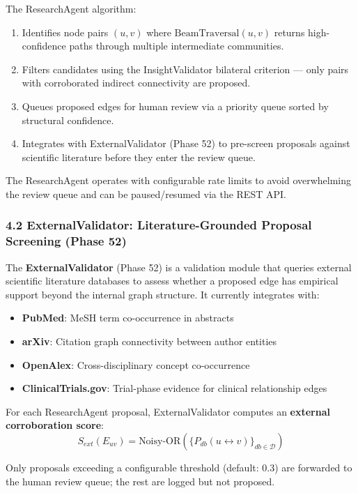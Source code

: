 The ResearchAgent algorithm:
\begin{enumerate}
  \item Identifies node pairs $(u, v)$ where $\text{BeamTraversal}(u, v)$ returns high-confidence paths through multiple intermediate communities.
  \item Filters candidates using the InsightValidator bilateral criterion --- only pairs with corroborated indirect connectivity are proposed.
  \item Queues proposed edges for human review via a priority queue sorted by structural confidence.
  \item Integrates with ExternalValidator (Phase 52) to pre-screen proposals against scientific literature before they enter the review queue.
\end{enumerate}


The ResearchAgent operates with configurable rate limits to avoid overwhelming the review queue and can be paused/resumed via the REST API.

\subsubsection*{4.2 ExternalValidator: Literature-Grounded Proposal Screening (Phase 52)}
The \textbf{ExternalValidator} (Phase 52) is a validation module that queries external scientific literature databases to assess whether a proposed edge has empirical support beyond the internal graph structure. It currently integrates with:

\begin{itemize}
  \item \textbf{PubMed}: MeSH term co-occurrence in abstracts
  \item \textbf{arXiv}: Citation graph connectivity between author entities
  \item \textbf{OpenAlex}: Cross-disciplinary concept co-occurrence
  \item \textbf{ClinicalTrials.gov}: Trial-phase evidence for clinical relationship edges
\end{itemize}


For each ResearchAgent proposal, ExternalValidator computes an \textbf{external corroboration score}:
$$S_{ext}(E_{uv}) = \text{Noisy-OR}(\{P_{db}(u \leftrightarrow v)\}_{db \in \mathcal{D}})$$

Only proposals exceeding a configurable threshold (default: 0.3) are forwarded to the human review queue; the rest are logged but not proposed.

